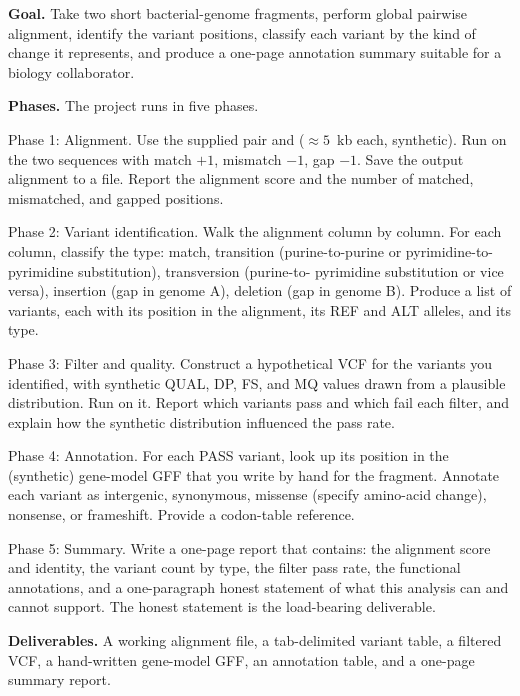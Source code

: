 \begin{project}
\textbf{Goal.}
Take two short bacterial-genome fragments, perform global pairwise
alignment, identify the variant positions, classify each variant by
the kind of change it represents, and produce a one-page annotation
summary suitable for a biology collaborator.

\textbf{Phases.}
The project runs in five phases.

Phase 1: Alignment. Use the supplied pair
 and
($\approx 5$~kb each, synthetic). Run
on the two sequences with match $+1$, mismatch $-1$, gap $-1$. Save the
output alignment to a file. Report the alignment score and the number
of matched, mismatched, and gapped positions.

Phase 2: Variant identification. Walk the alignment column by column.
For each column, classify the type: match, transition (purine-to-purine
or pyrimidine-to-pyrimidine substitution), transversion (purine-to-
pyrimidine substitution or vice versa), insertion (gap in genome A),
deletion (gap in genome B). Produce a list of variants, each with its
position in the alignment, its REF and ALT alleles, and its type.

Phase 3: Filter and quality. Construct a hypothetical VCF for the
variants you identified, with synthetic QUAL, DP, FS, and MQ values
drawn from a plausible distribution. Run
on it. Report which variants pass and which fail each filter, and
explain how the synthetic distribution influenced the pass rate.

Phase 4: Annotation. For each PASS variant, look up its position in
the (synthetic) gene-model GFF that you write by hand for the
fragment. Annotate each variant as intergenic, synonymous, missense
(specify amino-acid change), nonsense, or frameshift. Provide a
codon-table reference.

Phase 5: Summary. Write a one-page report that contains: the alignment
score and identity, the variant count by type, the filter pass rate,
the functional annotations, and a one-paragraph honest statement of
what this analysis can and cannot support. The honest statement is
the load-bearing deliverable.

\textbf{Deliverables.}
A working alignment file, a tab-delimited variant table, a filtered
VCF, a hand-written gene-model GFF, an annotation table, and a
one-page summary report.


\end{project}
